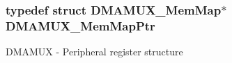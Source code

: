 \subsubsection[{\texorpdfstring{D\+M\+A\+M\+U\+X\+\_\+\+Mem\+Map\+Ptr}{DMAMUX_MemMapPtr}}]{\setlength{\rightskip}{0pt plus 5cm}typedef struct {\bf D\+M\+A\+M\+U\+X\+\_\+\+Mem\+Map}$\ast$ {\bf D\+M\+A\+M\+U\+X\+\_\+\+Mem\+Map\+Ptr}}\hypertarget{group___d_m_a_m_u_x___peripheral_ga736ab5b1ed284b3b4fdb63010a576777}{}\label{group___d_m_a_m_u_x___peripheral_ga736ab5b1ed284b3b4fdb63010a576777}
D\+M\+A\+M\+UX -\/ Peripheral register structure 